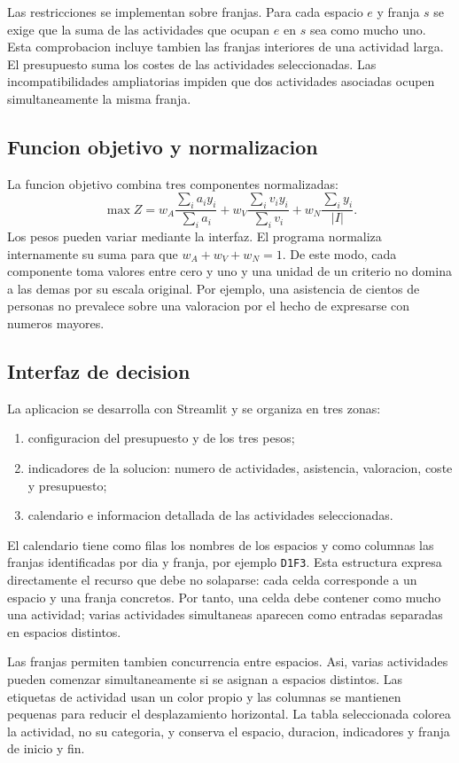 Las restricciones se implementan sobre franjas. Para cada espacio $e$ y franja $s$
se exige que la suma de las actividades que ocupan $e$ en $s$ sea como mucho uno.
Esta comprobacion incluye tambien las franjas interiores de una actividad larga.
El presupuesto suma los costes de las actividades seleccionadas. Las incompatibilidades
ampliatorias impiden que dos actividades asociadas ocupen simultaneamente la misma
franja.

\subsection{Funcion objetivo y normalizacion}

La funcion objetivo combina tres componentes normalizadas:
\[
\max Z=
w_A\frac{\sum_i a_i y_i}{\sum_i a_i}
+w_V\frac{\sum_i v_i y_i}{\sum_i v_i}
+w_N\frac{\sum_i y_i}{|I|}.
\]
Los pesos pueden variar mediante la interfaz. El programa normaliza internamente
su suma para que $w_A+w_V+w_N=1$. De este modo, cada componente toma valores entre
cero y uno y una unidad de un criterio no domina a las demas por su escala original.
Por ejemplo, una asistencia de cientos de personas no prevalece sobre una
valoracion por el hecho de expresarse con numeros mayores.

\subsection{Interfaz de decision}

La aplicacion se desarrolla con Streamlit y se organiza en tres zonas:
\begin{enumerate}
\item configuracion del presupuesto y de los tres pesos;
\item indicadores de la solucion: numero de actividades, asistencia, valoracion,
      coste y presupuesto;
\item calendario e informacion detallada de las actividades seleccionadas.
\end{enumerate}

El calendario tiene como filas los nombres de los espacios y como columnas las
franjas identificadas por dia y franja, por ejemplo \texttt{D1F3}. Esta estructura
expresa directamente el recurso que debe no solaparse: cada celda corresponde a un
espacio y una franja concretos. Por tanto, una celda debe contener como mucho una
actividad; varias actividades simultaneas aparecen como entradas separadas en
espacios distintos.

Las franjas permiten tambien concurrencia entre espacios. Asi, varias actividades
pueden comenzar simultaneamente si se asignan a espacios distintos. Las etiquetas
de actividad usan un color propio y las columnas se mantienen pequenas para reducir
el desplazamiento horizontal. La tabla seleccionada colorea la actividad, no su
categoria, y conserva el espacio, duracion, indicadores y franja de inicio y fin.


